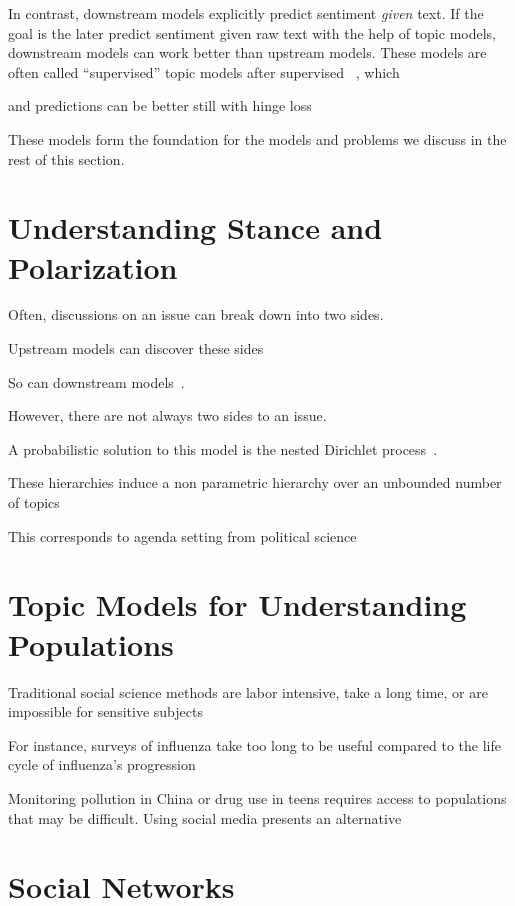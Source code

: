 In contrast, downstream models explicitly predict sentiment
\emph{given} text.  If the goal is the later predict sentiment given
raw text with the help of topic models, downstream models can work
better than upstream models.  These models are often called
``supervised'' topic models after supervised
~\citep{blei-07b}, which 

 and
predictions can be better still with hinge loss~\citep{zhu-09}

These models form the foundation for the models and problems we
discuss in the rest of this section.

\section{Understanding Stance and Polarization}

Often, discussions on an issue can break down into two sides.

Upstream models can discover these sides~\citep{paul-10}

So can downstream models~\citep{nguyen-13:shlda}.

However, there are not always two sides to an issue.

A probabilistic solution to this model is the nested Dirichlet
process~\citep{blei-07}.

These hierarchies induce a non parametric hierarchy over an unbounded
number of topics

This corresponds to agenda setting from political science~\citep{Nguyen:Boyd-Graber:Resnik:Miler-2015}

\section{Topic Models for Understanding Populations}

Traditional social science methods are labor intensive, take a long
time, or are impossible for sensitive subjects

For instance, surveys of influenza take too long to be useful compared
to the life cycle of influenza's progression~\cite{broniatowsky-15}

Monitoring pollution in China or drug use in teens requires access to
populations that may be difficult.  Using social media presents an
alternative~\cite{wang:paul:dredze-15}


\section{Social Networks}

